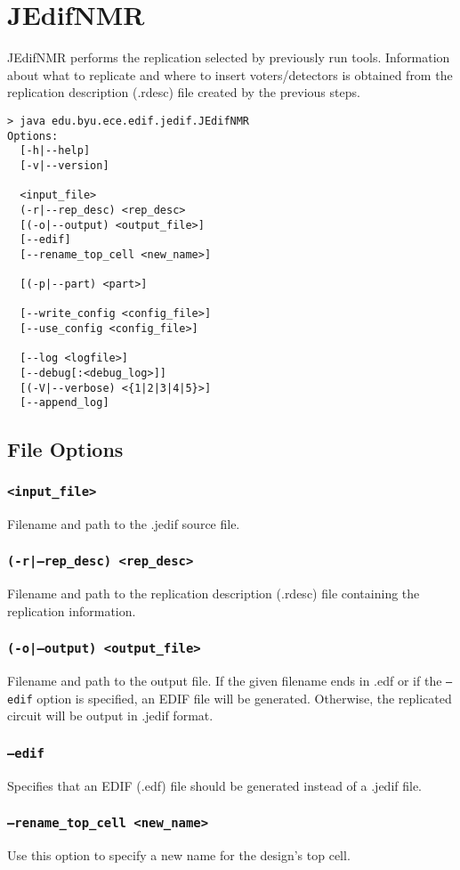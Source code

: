 \section{JEdifNMR}
JEdifNMR performs the replication selected by previously run
tools. Information about what to replicate and where to insert
voters/detectors is obtained from the replication description (.rdesc)
file created by the previous steps.

\begin{verbatim}
> java edu.byu.ece.edif.jedif.JEdifNMR
Options:
  [-h|--help]
  [-v|--version]

  <input_file>
  (-r|--rep_desc) <rep_desc>
  [(-o|--output) <output_file>]
  [--edif]
  [--rename_top_cell <new_name>]

  [(-p|--part) <part>]
  
  [--write_config <config_file>]
  [--use_config <config_file>]

  [--log <logfile>]
  [--debug[:<debug_log>]]
  [(-V|--verbose) <{1|2|3|4|5}>]
  [--append_log]
\end{verbatim}

\subsection{File Options}

\subsubsection{\texttt{<input\_file>}}
Filename and path to the .jedif source file.

\subsubsection{\texttt{(-r|--rep\_desc) <rep\_desc>}}
Filename and path to the replication description (.rdesc) file containing the
replication information.

\subsubsection{\texttt{(-o|--output) <output\_file>}}
Filename and path to the output file. If the given filename ends in .edf or if
the \texttt{--edif} option is specified, an EDIF file will be generated.
Otherwise, the replicated circuit will be output in .jedif format.

\subsubsection{\texttt{--edif}}
Specifies that an EDIF (.edf) file should be generated instead of a .jedif file.

\subsubsection{\texttt{--rename\_top\_cell <new\_name>}}
Use this option to specify a new name for the design's top cell.






